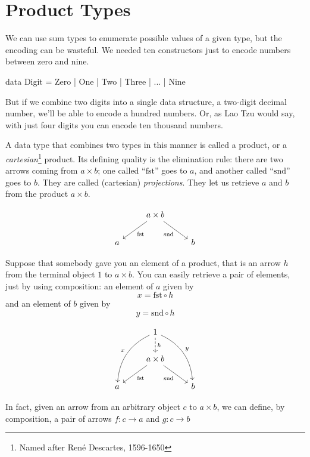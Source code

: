 \documentclass[DaoFP]{subfiles}
\begin{document}
\setcounter{chapter}{4}

\chapter{Product Types}

We can use sum types to enumerate possible values of a given type, but the encoding can be wasteful. We needed ten constructors just to encode numbers between zero and nine.
\begin{haskell}
data Digit = Zero | One | Two | Three | ... | Nine
\end{haskell}
But if we combine two digits into a single data structure, a two-digit decimal number, we'll be able to encode a hundred numbers. Or, as Lao Tzu would say, with just four digits you can encode ten thousand numbers.

A data type that combines two types in this manner is called a product, or a \emph{cartesian}\footnote{Named after René Descartes, 1596-1650} product. Its defining quality is the elimination rule: there are two arrows coming from $a \times b$; one called ``$\text{fst}$'' goes to $a$, and another called ``$\text{snd}$'' goes to $b$. They are called (cartesian) \emph{projections}. They let us retrieve $a$ and $b$ from the product $a \times b$.

\[
 \begin{tikzcd}
& a \times b
 \arrow[dl,  "\text{fst}"]
 \arrow[dr,   "\text{snd}"']
\\
a && b
 \end{tikzcd}
\]

Suppose that somebody gave you an element of a product, that is an arrow $h$ from the terminal object $1$ to $a \times b$. You can easily retrieve a pair of elements, just by using composition: an element of $a$ given by 
\[x = \text{fst} \circ h \]
and an element of $b$ given by
\[y = \text{snd} \circ h \]

\[
 \begin{tikzcd}
 & 1
\arrow[d, dashed, "h"]
 \arrow[ddl, bend right, "x"']
 \arrow[ddr, bend left, "y"]
\\
&a \times b
 \arrow[dl,  "\text{fst}"]
 \arrow[dr,   "\text{snd}"']
\\
a && b
 \end{tikzcd}
\]

In fact, given an arrow from an arbitrary object $c$ to $a \times b$, we can define, by composition, a pair of arrows $f \colon c \to a$ and $g \colon c \to b$
\end{document}
